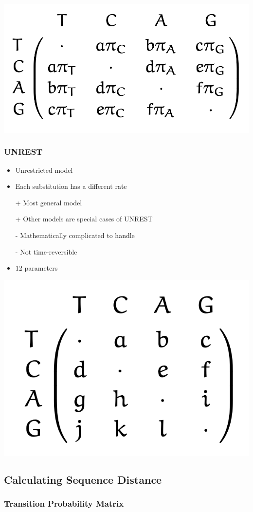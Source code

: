 \documentclass{article}
\begin{document}
\begin{multicols*}{3}
\begin{center}
    \includegraphics[width=0.7\linewidth]{GTR.png}
\end{center}
\subsubsection{UNREST}

\begin{itemize}
    \item Unrestricted model 
    \item Each substitution has a different rate
    \item[+] Most general model 
    \item[+] Other models are special cases of UNREST
    \item[-] Mathematically complicated to handle
    \item[-] Not time-reversible
    \item 12 parameters 
\end{itemize}

\begin{center}
    \includegraphics[width=0.5\linewidth]{unrest.png}
\end{center}

\subsection{Calculating Sequence Distance}
\subsubsection{Transition Probability Matrix}
\label{transprobmat}


\end{multicols*}
\end{document}
